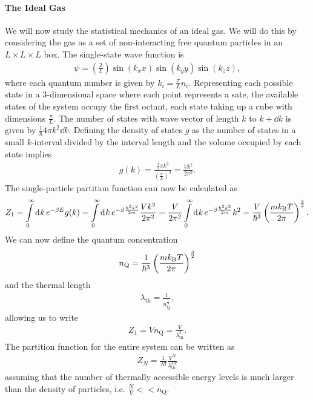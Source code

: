 \paragraph{The Ideal Gas}
We will now study the statistical mechanics of an ideal gas. We will do this by considering the gas as a set of non-interacting free quantum particles in an $L\times L\times L$ box. The single-state wave function is
\begin{align*}
	\psi = \left(\frac{2}{L}\right)\sin(k_{x}x)\sin(k_{y}y)\sin(k_{z}z),
\end{align*}
where each quantum number is given by $k_{i} = \frac{\pi}{L}n_{i}$. Representing each possible state in a $3$-dimensional space where each point represents a sate, the available states of the system occupy the first octant, each state taking up a cube with dimensions $\frac{\pi}{L}$. The number of states with wave vector of length $k$ to $k + \dd{k}$ is given by $\frac{1}{8}4\pi k^{2}\dd{k}$. Defining the density of states $g$ as the number of states in a small $k$-interval divided by the interval length and the volume occupied by each state implies 
\begin{align*}
	g(k) = \frac{\frac{1}{2}\pi k^{2}}{\left(\frac{\pi}{L}\right)^{3}} = \frac{Vk^{2}}{2\pi^{2}}.
\end{align*}
The single-particle partition function can now be calculated as
\begin{align*}
	Z_{1} = \int\limits_{0}^{\infty}\dd[]{k}e^{-\beta E}g(k) = \int\limits_{0}^{\infty}\dd[]{k}e^{-\beta\frac{\hbar^{2}k^{2}}{2m}}\frac{Vk^{2}}{2\pi^{2}} = \frac{V}{2\pi^{2}}\int\limits_{0}^{\infty}\dd[]{k}e^{-\beta\frac{\hbar^{2}k^{2}}{2m}}k^{2} = \frac{V}{\hbar^{3}}\left(\frac{mk_{\text{B}} T}{2\pi}\right)^{\frac{3}{2}}.
\end{align*}
We can now define the quantum concentration
\begin{align*}
	n_{\text{Q}} = \frac{1}{\hbar^{3}}\left(\frac{mk_{\text{B}} T}{2\pi}\right)^{\frac{3}{2}}
\end{align*}
and the thermal length
\begin{align*}
	\lambda_{\text{th}} = \frac{1}{n_{\text{Q}}^{\frac{1}{3}}},
\end{align*}
allowing us to write
\begin{align*}
	Z_{1} = Vn_{\text{Q}} = \frac{V}{\lambda_{\text{th}}^{3}}.
\end{align*}
The partition function for the entire system can be written as
\begin{align*}
	Z_{N} = \frac{1}{N!}\frac{V^{N}}{\lambda_{\text{th}}^{3N}}
\end{align*}
assuming that the number of thermally accessible energy levels is much larger than the density of particles, i.e. $\frac{N}{V} << n_{\text{Q}}$.

